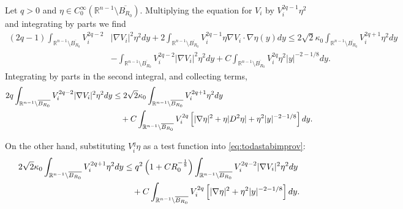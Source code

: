\documentclass{article}
\newcommand{\R}{\mathbb{R}}
\theoremstyle{definition}
\begin{document}
Let $q > 0$ and $\eta \in C_0^\infty (\R^{n-1}\setminus \overline{B_{R_0}})$. Multiplying the equation for $V_i$ by $V_i^{2q - 1} \eta^2$ and integrating by parts we find
\begin{align*}
(2q-1) \int_{\R^{n-1}\setminus \overline{B_{R_0}}} V_i^{2q - 2} &|\nabla V_i|^2 \eta^2  dy+2\int_{\R^{n-1}\setminus \overline{B_{R_0}}} V_i^{2q - 1} \eta \nabla V_i \cdot \nabla \eta(y)  dy \leq 2\sqrt{2}\kappa_0 \int_{\R^{n-1}\setminus \overline{B_{R_0}}} V_i^{2q + 1} \eta^2  dy  \\
&-\int_{\R^{n-1}\setminus \overline{B_{R_0}}} V_i^{2q - 2} |\nabla V_i|^2 \eta^2  dy + C \int_{\R^{n-1}\setminus \overline{B_{R_0}}} V_i^{2q} \eta^2 |y|^{-2 - 1/8} dy.
\end{align*}
Integrating by parts in the second integral, and collecting terms,
\begin{align}
2q \int_{\R^{n-1}\setminus \overline{B_{R_0}}} V_i^{2q - 2} |\nabla V_i|^2 \eta^2  dy &\leq 2\sqrt{2}\kappa_0 \int_{\R^{n-1}\setminus \overline{B_{R_0}}} V_i^{2q + 1} \eta^2  dy \notag \\
&\quad + C \int_{\R^{n-1}\setminus \overline{B_{R_0}}} V_i^{2q} \left[ |\nabla \eta|^2 + \eta |D^2 \eta| + \eta^2 |y|^{-2 - 1/8} \right] dy.\label{eq:128fgouiqbgf}
\end{align}

On the other hand, substituting $V_i^q \eta$ as a test function into \eqref{eq:todastabimprov}:
\begin{align}
2\sqrt{2}\kappa_0 \int_{\R^{n-1}\setminus \overline{B_{R_0}}} V_i^{2q + 1} \eta^2 dy
&\leq q^2 \left(1 + C R_0^{-\frac{1}{8}} \right) \int_{\R^{n-1}\setminus \overline{B_{R_0}}} V_i^{2q - 2} |\nabla V_i|^2 \eta^2 dy \notag \\
&\quad + C \int_{\R^{n-1}\setminus \overline{B_{R_0}}} V_i^{2q} \left[ |\nabla \eta|^2 + \eta^2 |y|^{-2 - 1/8} \right] dy. \label{eq:128fgouiqbgf2}
\end{align}
\end{document}
